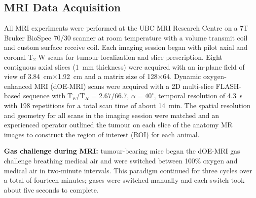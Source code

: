 \subsection{MRI Data Acquisition}
\label{doemri_mrianalysis1}
All MRI experiments were performed at the UBC MRI Research Centre on a 7T Bruker BioSpec 70/30 scanner at room temperature with a volume transmit coil and custom surface receive coil.
Each imaging session began with pilot axial and coronal T$_2$-W scans for tumour localization and slice prescription.
Eight contiguous axial slices (1~mm thickness) were acquired with an in-plane field of view of 3.84~cm$\times$1.92~cm and a matrix size of 128$\times$64.
Dynamic oxygen-enhanced MRI (dOE-MRI) scans were acquired with a 2D multi-slice FLASH-based sequence with T$_E$/T$_R$ = 2.67/66.7, $\alpha=40^\circ$, temporal resolution of 4.3~s with 198 repetitions for a total scan time of about 14~min.
The spatial resolution and geometry for all scans in the imaging session were matched and an experienced operator outlined the tumour on each slice of the anatomy MR images to construct the region of interest (ROI) for each animal.

\noindent\textbf{Gas challenge during MRI:} tumour-bearing mice began the \acs{dOE-MRI} gas challenge breathing medical air and were switched between 100\% oxygen and medical air in two-minute intervals.
This paradigm continued for three cycles over a total of fourteen minutes; gases were switched manually and each switch took about five seconds to complete.

